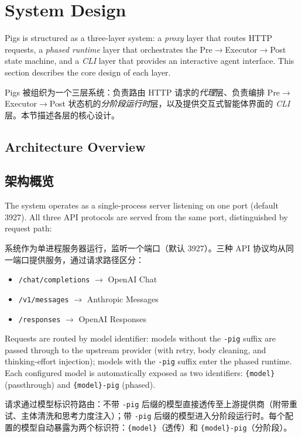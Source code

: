 \section{System Design}
\label{sec:design}

Pigs is structured as a three-layer system: a \emph{proxy} layer that routes HTTP requests, a \emph{phased runtime} layer that orchestrates the Pre$\rightarrow$Executor$\rightarrow$Post state machine, and a \emph{CLI} layer that provides an interactive agent interface. This section describes the core design of each layer.
\begin{chinese}
Pigs 被组织为一个三层系统：负责路由 HTTP 请求的\emph{代理}层、负责编排 Pre$\rightarrow$Executor$\rightarrow$Post 状态机的\emph{分阶段运行时}层，以及提供交互式智能体界面的 \emph{CLI} 层。本节描述各层的核心设计。
\end{chinese}

\subsection{Architecture Overview}
\label{sec:overview}
\begin{chinese}
\subsection{架构概览}
\end{chinese}

The system operates as a single-process server listening on one port (default 3927). All three API protocols are served from the same port, distinguished by request path:
\begin{chinese}
系统作为单进程服务器运行，监听一个端口（默认 3927）。三种 API 协议均从同一端口提供服务，通过请求路径区分：
\end{chinese}

\begin{itemize}[nosep]
    \item \texttt{/chat/completions} $\rightarrow$ OpenAI Chat
    \item \texttt{/v1/messages} $\rightarrow$ Anthropic Messages
    \item \texttt{/responses} $\rightarrow$ OpenAI Responses
\end{itemize}

Requests are routed by model identifier: models without the \texttt{-pig} suffix are passed through to the upstream provider (with retry, body cleaning, and thinking-effort injection); models with the \texttt{-pig} suffix enter the phased runtime. Each configured model is automatically exposed as two identifiers: \texttt{\{model\}} (passthrough) and \texttt{\{model\}-pig} (phased).
\begin{chinese}
请求通过模型标识符路由：不带 \texttt{-pig} 后缀的模型直接透传至上游提供商（附带重试、主体清洗和思考力度注入）；带 \texttt{-pig} 后缀的模型进入分阶段运行时。每个配置的模型自动暴露为两个标识符：\texttt{\{model\}}（透传）和 \texttt{\{model\}-pig}（分阶段）。
\end{chinese}

